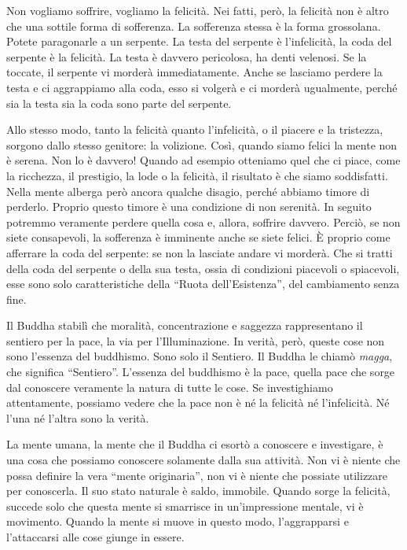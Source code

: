 Non vogliamo soffrire, vogliamo la felicità. Nei fatti, però, la
felicità non è altro che una sottile forma di sofferenza. La sofferenza
stessa è la forma grossolana. Potete paragonarle a un serpente. La testa
del serpente è l'infelicità, la coda del serpente è la felicità. La
testa è davvero pericolosa, ha denti velenosi. Se la toccate, il
serpente vi morderà immediatamente. Anche se lasciamo perdere la testa e
ci aggrappiamo alla coda, esso si volgerà e ci morderà ugualmente,
perché sia la testa sia la coda sono parte del serpente.

Allo stesso modo, tanto la felicità quanto l'infelicità, o il piacere e
la tristezza, sorgono dallo stesso genitore: la volizione. Così, quando
siamo felici la mente non è serena. Non lo è davvero! Quando ad esempio
otteniamo quel che ci piace, come la ricchezza, il prestigio, la lode o
la felicità, il risultato è che siamo soddisfatti. Nella mente alberga
però ancora qualche disagio, perché abbiamo timore di perderlo. Proprio
questo timore è una condizione di non serenità. In seguito potremmo
veramente perdere quella cosa e, allora, soffrire davvero. Perciò, se
non siete consapevoli, la sofferenza è imminente anche se siete felici.
È proprio come afferrare la coda del serpente: se non la lasciate andare
vi morderà. Che si tratti della coda del serpente o della sua testa,
ossia di condizioni piacevoli o spiacevoli, esse sono solo
caratteristiche della ``Ruota dell'Esistenza'', del cambiamento senza
fine.

Il Buddha stabilì che moralità, concentrazione e saggezza rappresentano
il sentiero per la pace, la via per l'Illuminazione. In verità, però,
queste cose non sono l'essenza del buddhismo. Sono solo il Sentiero. Il
Buddha le chiamò \emph{magga}, che significa ``Sentiero''. L'essenza del
buddhismo è la pace, quella pace che sorge dal conoscere veramente la
natura di tutte le cose. Se investighiamo attentamente, possiamo vedere
che la pace non è né la felicità né l'infelicità. Né l'una né l'altra
sono la verità.

La mente umana, la mente che il Buddha ci esortò a conoscere e
investigare, è una cosa che possiamo conoscere solamente dalla sua
attività. Non vi è niente che possa definire la vera ``mente
originaria'', non vi è niente che possiate utilizzare per conoscerla. Il
suo stato naturale è saldo, immobile. Quando sorge la felicità, succede
solo che questa mente si smarrisce in un'impressione mentale, vi è
movimento. Quando la mente si muove in questo modo, l'aggrapparsi e
l'attaccarsi alle cose giunge in essere.

